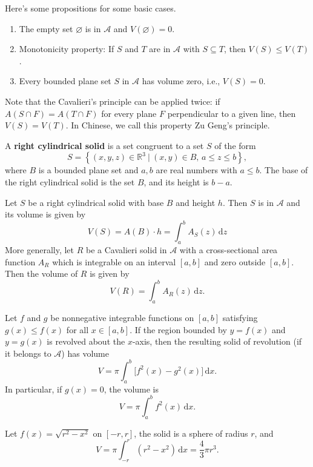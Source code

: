 \documentclass[a4paper]{ctexart}
\begin{document}
	\begin{mypro}
		Here's some propositions for some basic cases.
		\begin{enumerate}
			\item The empty set $\varnothing$ is in $\mathcal{A}$ and $V(\varnothing)=0$.
			\item Monotonicity property: If $S$ and $T$ are in $\mathcal{A}$ with $S\subseteq T$, then $V(S)\le V(T)$.
			\item Every bounded plane set $S$ in $\mathcal{A}$ has volume zero, i.e., $V(S)=0$.
		\end{enumerate}
	\end{mypro}
	\begin{myrmk}
		Note that the Cavalieri's principle can be applied twice: if $A(S\cap F)=A(T\cap F)$ for every plane $F$ perpendicular to a given line, then $V(S)=V(T)$. In Chinese, we call this property Zu Geng's principle.
	\end{myrmk}
	\begin{mydef}
		A \textbf{right cylindrical solid} is a set congruent to a set $S$ of the form
		\[
		S=\left\{(x,y,z)\in \mathbb{R}^3\ |\ (x,y)\in B,\, a\le z \le b \right\},
		\]
		where $B$ is a bounded plane set and $a,b$ are real numbers with $a\le b$. The base of the right cylindrical solid is the set $B$, and its height is $b-a$.
	\end{mydef}
	\begin{mythm}
		Let $S$ be a right cylindrical solid with base $B$ and height $h$. Then $S$ is in $\mathcal{A}$ and its volume is given by
		\[
		V(S)=A(B)\cdot h=\int_a^b A_S(z)\,\mathrm{d}z
		\]
		More generally, let $R$ be a Cavalieri solid in $\mathcal{A}$ with a cross-sectional area function $A_R$ which is integrable on an interval $[a,b]$ and zero outside $[a,b]$. Then the volume of $R$ is given by
		\[
		V(R)=\int_a^b A_R(z)\,\mathrm{d}z.
		\]
	\end{mythm}
	
	\begin{mythm}
	Let $f$ and $g$ be nonnegative integrable functions on $[a,b]$ satisfying $g(x) \le f(x)$ for all $x \in [a,b]$. If the region bounded by $y = f(x)$ and $y = g(x)$ is revolved about the $x$-axis, then the resulting solid of revolution (if it belongs to $\mathcal{A}$) has volume
	\[
		V = \pi \int_a^b \bigl[f^2(x) - g^2(x)\bigr] \, \mathrm{d}x .
	\]
	In particular, if $g(x) = 0$, the volume is
	\[
		V = \pi \int_a^b f^2(x) \, \mathrm{d}x .
	\]
	\end{mythm}
	\begin{myex}
		 Let $f(x) = \sqrt{r^2 - x^2}$ on $[-r,r]$, the solid is a sphere of radius $r$, and
		\[
		V = \pi \int_{-r}^{r} (r^2 - x^2)\, \mathrm{d}x = \frac{4}{3}\pi r^3.
		\]
	\end{myex}
\end{document}
